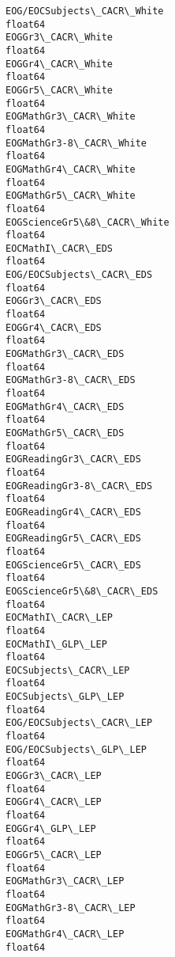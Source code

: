 \documentclass[11pt]{article}
\begin{document}
\begin{Verbatim}[commandchars=\\\{\}]
EOG/EOCSubjects\_CACR\_White                                      float64
EOGGr3\_CACR\_White                                               float64
EOGGr4\_CACR\_White                                               float64
EOGGr5\_CACR\_White                                               float64
EOGMathGr3\_CACR\_White                                           float64
EOGMathGr3-8\_CACR\_White                                         float64
EOGMathGr4\_CACR\_White                                           float64
EOGMathGr5\_CACR\_White                                           float64
EOGScienceGr5\&8\_CACR\_White                                      float64
EOCMathI\_CACR\_EDS                                               float64
EOG/EOCSubjects\_CACR\_EDS                                        float64
EOGGr3\_CACR\_EDS                                                 float64
EOGGr4\_CACR\_EDS                                                 float64
EOGMathGr3\_CACR\_EDS                                             float64
EOGMathGr3-8\_CACR\_EDS                                           float64
EOGMathGr4\_CACR\_EDS                                             float64
EOGMathGr5\_CACR\_EDS                                             float64
EOGReadingGr3\_CACR\_EDS                                          float64
EOGReadingGr3-8\_CACR\_EDS                                        float64
EOGReadingGr4\_CACR\_EDS                                          float64
EOGReadingGr5\_CACR\_EDS                                          float64
EOGScienceGr5\_CACR\_EDS                                          float64
EOGScienceGr5\&8\_CACR\_EDS                                        float64
EOCMathI\_CACR\_LEP                                               float64
EOCMathI\_GLP\_LEP                                                float64
EOCSubjects\_CACR\_LEP                                            float64
EOCSubjects\_GLP\_LEP                                             float64
EOG/EOCSubjects\_CACR\_LEP                                        float64
EOG/EOCSubjects\_GLP\_LEP                                         float64
EOGGr3\_CACR\_LEP                                                 float64
EOGGr4\_CACR\_LEP                                                 float64
EOGGr4\_GLP\_LEP                                                  float64
EOGGr5\_CACR\_LEP                                                 float64
EOGMathGr3\_CACR\_LEP                                             float64
EOGMathGr3-8\_CACR\_LEP                                           float64
EOGMathGr4\_CACR\_LEP                                             float64

\end{Verbatim}
\end{document}
